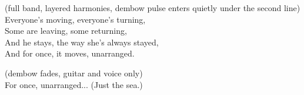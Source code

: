 \begin{lyrics}
 (full band, layered harmonies, dembow pulse enters quietly under the second line)\\
Everyone's moving, everyone's turning,\\
Some are leaving, some returning,\\
And he stays, the way she's always stayed,\\
And for once, it moves, unarranged.

 (dembow fades, guitar and voice only)\\
For once, unarranged...
(Just the sea.)
\end{lyrics}

